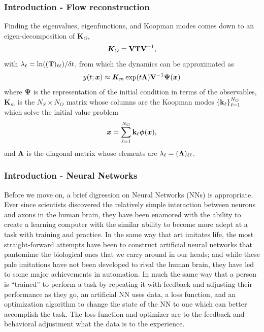 \documentclass[11pt,aspectratio=169]{beamer}
\newcommand{\bracks}[1]{\left\{#1\right\}}
\begin{document}
    \begin{frame}
        \frametitle{Introduction - Flow reconstruction}
        Finding the eigenvalues, eigenfunctions, and Koopman modes comes down to an 
        eigen-decomposition of $\boldsymbol{K}_O$,
        \begin{equation}
            \boldsymbol{K}_O = {\bf VTV}^{-1}, 
        \end{equation}
        with $\lambda_\ell = \ln(({\bf T})_{\ell\ell})/\delta t$,
        from which the dynamics can be approximated as 
        \begin{equation}
            y(t;\boldsymbol{x}) \approx \boldsymbol{K}_m\exp(t{\bf\Lambda}){\bf V}^{-1}\boldsymbol{\Psi}(\boldsymbol{x}) 
        \end{equation}
        where $\boldsymbol{\Psi}$ is the representation of the initial condition in terms of the observables, 
        $\boldsymbol{K}_m$ is the $N_S \times N_O$ matrix whose columns are the Koopman modes 
        $\bracks{{\bf k}_\ell}_{\ell=1}^{N_O}$ which solve the initial value problem
        \begin{equation}
            \boldsymbol{x} = \sum_{\ell=1}^{N_O}{\bf k}_\ell\boldsymbol{\phi}(\boldsymbol{x}),
        \end{equation}
        and ${\bf \Lambda}$ is the diagonal matrix whose elements are $\lambda_\ell
        = ({\bf \Lambda})_{\ell\ell}$.
    \end{frame}

    \begin{frame}
        \frametitle{Introduction - Neural Networks}
        Before we move on, a brief digression on Neural Networks (NNs) is appropriate. Ever since
        scientists discovered the relatively simple interaction between neurons and axons in 
        the human brain, they have been enamored with the ability to create a learning computer 
        with the similar ability to become more adept at a task with training and practice. 
        In the same way that art imitates life, the most straight-forward attempts have been 
        to construct artificial neural networks that pantomime the biological ones that we carry 
        around in our heads; and while these pale imitations have not been developed to rival the 
        human brain, they have led to some major achievements in automation. In much the same 
        way that a person is ``trained'' to perform a task by repeating it with feedback and 
        adjusting their performance as they go, an artificial NN uses data, a loss function, and 
        an optimization algorithm to change the state of the NN to one which can better accomplish 
        the task. The loss function and optimizer are to the feedback and behavioral adjustment 
        what the data is to the experience. 
    \end{frame}
\end{document}
